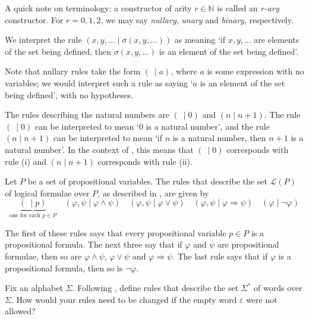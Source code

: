 A quick note on terminology: a constructor of arity $r \in \mathbb{N}$ is called an \textit{$r$-ary} constructor. For $r=0,1,2$, we may say \textit{nullary}, \textit{unary} and \textit{binary}, respectively.

We interpret the rule $(x,y,\dots{} \mid \sigma(x,y,\dots{}))$ as meaning `if $x,y,\dots$ are elements of the set being defined, then $\sigma(x,y,\dots{})$ is an element of the set being defined'.

Note that nullary rules take the form $(~ \mid a)$, where $a$ is some expression with no variables; we would interpret such a rule as saying `$a$ is an element of the set being defined', with no hypotheses.

\begin{example}
The rules describing the natural numbers are $(~ \mid 0)$ and $(n \mid n+1)$. The rule $(~ \mid 0)$ can be interpreted to mean `$0$ is a natural number', and the rule $(n \mid n+1)$ can be interpreted to mean `if $n$ is a natural number, then $n+1$ is a natural number'. In the context of , this means that $(~ \mid 0)$ corresponds with rule (i) and $(n \mid n+1)$ corresponds with rule (ii).
\end{example}

\begin{example}
\label{exRulesForInductiveDefinitionOfPropositionalFormulae}
Let $P$ be a set of propositional variables. The rules that describe the set $\mathcal{L}(P)$ of logical formulae over $P$, as described in , are given by
\[ \underbrace{(~ \mid p)}_{\text{one for each } p \in P} \quad (\varphi,\psi \mid \varphi \wedge \psi) \quad (\varphi,\psi \mid \varphi \vee \psi) \quad (\varphi,\psi \mid \varphi \Rightarrow \psi) \quad (\varphi \mid \neg \varphi) \]

The first of these rules says that every propositional variable $p \in P$ is a propositional formula. The next three say that if $\varphi$ and $\psi$ are propositional formulae, then so are $\varphi \wedge \psi$, $\varphi \vee \psi$ and $\varphi \Rightarrow \psi$. The last rule says that if $\varphi$ is a propositional formula, then so is $\neg \varphi$.
\end{example}

\begin{exercise}
\label{exRulesForInductiveDefinitionOfWords}
Fix an alphabet $\Sigma$. Following , define rules that describe the set $\Sigma^*$ of words over $\Sigma$. How would your rules need to be changed if the empty word $\varepsilon$ were not allowed?
\end{exercise}

